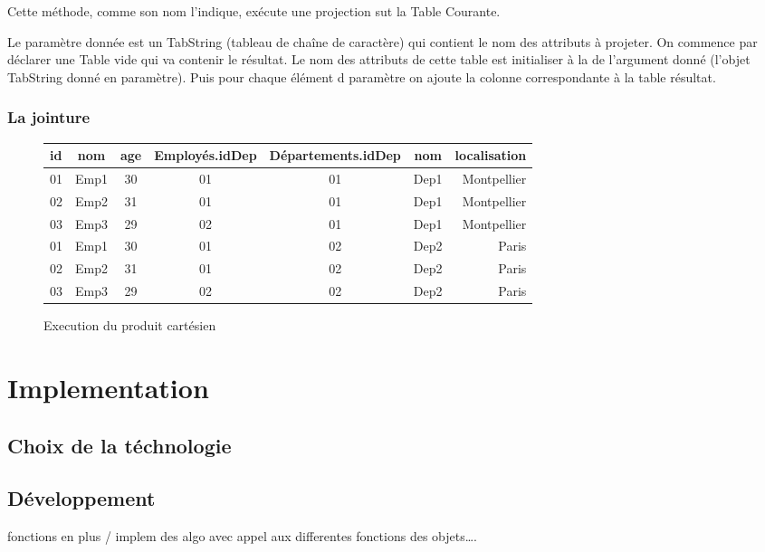\documentclass[oneside,13pt,a4paper]{report}
\begin{document}
Cette méthode, comme son nom l'indique, exécute une projection sut la Table Courante.

Le paramètre donnée est un TabString (tableau de chaîne de caractère) qui contient le nom des attributs à projeter.
On commence par déclarer une Table vide qui va contenir le résultat.
Le nom des attributs de cette table est initialiser à la de l'argument donné (l'objet TabString donné en paramètre).
Puis pour chaque élément d paramètre on ajoute la colonne correspondante à la table résultat.

\subsection{La jointure}
	\begin{figure}[h!]
		\centering
		\caption{Execution du produit cartésien}
		\begin{tabular}{|l|c|c|c|c|c|r|}
			\hline
			id   & nom  & age & Employés.idDep & Départements.idDep & nom   & localisation 
			\\
			\hline
			01 & Emp1 &  30 & 01 & 01 & Dep1 &  Montpellier \\
			02 & Emp2 &  31 & 01 & 01 & Dep1 &  Montpellier \\
			03 & Emp3 &  29 & 02 & 01 & Dep1 &  Montpellier \\
			01 & Emp1 &  30 & 01 & 02 & Dep2 &  Paris \\
			02 & Emp2 &  31 & 01 & 02 & Dep2 &  Paris \\
			03 & Emp3 &  29 & 02 & 02 & Dep2 &  Paris \\
			\hline
		\end{tabular}
	\end{figure}

\chapter{Implementation}

\section{Choix de la téchnologie}

\section{Développement}

fonctions en plus / implem des algo avec appel aux differentes fonctions des objets….
\end{document}

